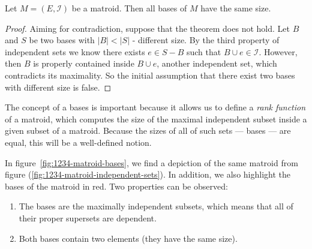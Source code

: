 \begin{theorem} \label{thm:bases-have-equal-size}
    Let $M = (E, \mathcal{I})$ be a matroid. Then all bases of $M$ have the same size.
\end{theorem}

\begin{proof}
    Aiming for contradiction, suppose that the theorem does not hold. Let $B$ and $S$ be two bases with $|B| < |S|$ - different size. By the third property of independent sets we know there exists $e \in S - B$ such that $ B \cup e \in \mathcal{I}$. However, then $B$ is properly contained inside $B \cup e$, another independent set, which contradicts its maximality. So the initial assumption that there exist two bases with different size is false.
\end{proof}

The concept of a bases is important because it allows us to define a \textit{rank function} of a matroid, which computes the size of the maximal independent subset inside a given subset of a matroid.  Because the sizes of all of such sets --- bases --- are equal, this will be a well-defined notion.

\begin{exmp}
    In figure~\ref{fig:1234-matroid-bases}, we find a depiction of the same matroid from figure (\ref{fig:1234-matroid-independent-sets}). In addition, we also highlight the bases of the matroid in red. Two properties can be observed:
\begin{enumerate}
    \item The bases are the maximally independent subsets, which means that all of their proper supersets are dependent. 
    \item Both bases contain two elements (they have the same size).
\end{enumerate}
\end{exmp}

